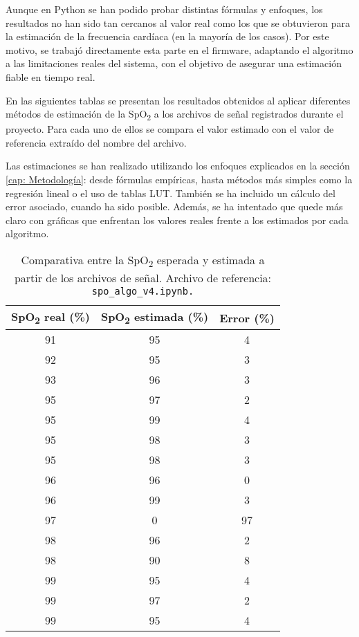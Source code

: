 Aunque en Python se han podido probar distintas fórmulas y enfoques, los resultados no han sido tan cercanos al valor real como los que se obtuvieron para la estimación de la frecuencia cardíaca (en la mayoría de los casos). Por este motivo, se trabajó directamente esta parte en el firmware, adaptando el algoritmo a las limitaciones reales del sistema, con el objetivo de asegurar una estimación fiable en tiempo real.

En las siguientes tablas se presentan los resultados obtenidos al aplicar diferentes métodos de estimación de la SpO\textsubscript{2} a los archivos de señal registrados durante el proyecto. Para cada uno de ellos se compara el valor estimado con el valor de referencia extraído del nombre del archivo.

Las estimaciones se han realizado utilizando los enfoques explicados en la sección \ref{cap: Metodología}: desde fórmulas empíricas, hasta métodos más simples como la regresión lineal o el uso de tablas LUT. También se ha incluido un cálculo del error asociado, cuando ha sido posible. Además, se ha intentado que quede más claro con gráficas que enfrentan los valores reales frente a los estimados por cada algoritmo.


\begin{table}[H]
\centering
\begin{tabular}{|c|c|c|}
\hline
\textbf{SpO\textsubscript{2} real (\%)} & \textbf{SpO\textsubscript{2} estimada (\%)} & \textbf{Error (\%)} \\
\hline
91 & 95 & 4 \\
\hline
92 & 95 & 3 \\
\hline
93 & 96 & 3 \\
\hline
95 & 97 & 2 \\
\hline
95 & 99 & 4 \\
\hline
95 & 98 & 3 \\
\hline
95 & 98 & 3 \\
\hline
96 & 96 & 0 \\
\hline
96 & 99 & 3 \\
\hline
97 & 0 & 97 \\
\hline
98 & 96 & 2 \\
\hline
98 & 90 & 8 \\
\hline
99 & 95 & 4 \\
\hline
99 & 97 & 2 \\
\hline
99 & 95 & 4 \\
\hline
\end{tabular}
\caption{Comparativa entre la SpO\textsubscript{2} esperada y estimada a partir de los archivos de señal. Archivo de referencia: \texttt{spo\_algo\_v4.ipynb.}}
\label{tabla:spo2_validacion_maxim}
\end{table}

